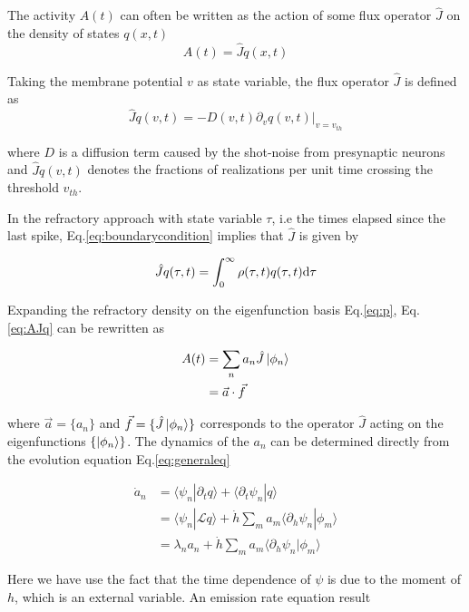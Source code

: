 \documentclass[12pt,twoside]{report}
\def \dd  {{\rm d}}
\begin{document}
The activity $A(t)$ can often be written as the action of some flux operator $\hat{J}$ on the density of states $q(x,t)$
\begin{equation}
\label{eq:AJq}
A(t)=\hat{J}q(x,t)
\end{equation}

Taking the membrane potential $v$ as state variable, the flux operator $\hat{J}$ is defined as
\begin{equation}
\hat{J}q(v,t)=-D(v,t)\partial_v q(v,t)|_{v=v_{th}}
\end{equation}

where $D$ is a diffusion term caused by the shot-noise from presynaptic neurons and $\hat{J}q(v,t)$ denotes the fractions of realizations per unit time crossing the threshold $v_{th}$.

In the refractory approach with state variable $\tau$, i.e the times elapsed since the last spike, Eq.\eqref{eq:boundarycondition} implies that $\hat{J}$ is given by

\begin{equation}
\hat{J}q(\tau,t)=\int_0^\infty \rho(\tau,t)q(\tau,t)\dd \tau
\end{equation}

Expanding the refractory density on the eigenfunction basis Eq.\eqref{eq:p},  Eq.\eqref{eq:AJq} can be rewritten as

\begin{align}
\label{eq:AJphi}
A(t)&=\sum_n a_n\hat{J}\ket{\phi_n} \nonumber \\
&=\vec{a}\cdot\vec{f}
\end{align}

where $\vec{a}=\{a_n\}$ and $\vec{f}=\{\hat{J}\ket{\phi_n}\}$ corresponds to the operator $\hat{J}$ acting on the eigenfunctions $\{\ket{\phi_n}\}$.
The dynamics of the $a_n$ can be determined directly from the evolution equation Eq.\eqref{eq:generaleq}

\begin{align}
\label{eq:andyn}
\dot{a}_n&=\langle\psi_n|\partial_t q\rangle+\langle\partial_t\psi_n|q\rangle \nonumber \\
&=\langle\psi_n|\mathcal{L}q\rangle+  \dot{h}\sum_ma_m\langle\partial_h\psi_n|\phi_m \rangle \nonumber \\
&=\lambda_n a_n +  \dot{h}\sum_ma_m\langle\partial_h\psi_n|\phi_m \rangle 
\end{align}


Here we have use the fact that the time dependence of $\psi$ is due to the moment of $h$, which is an external variable. An emission rate equation result
\end{document}
